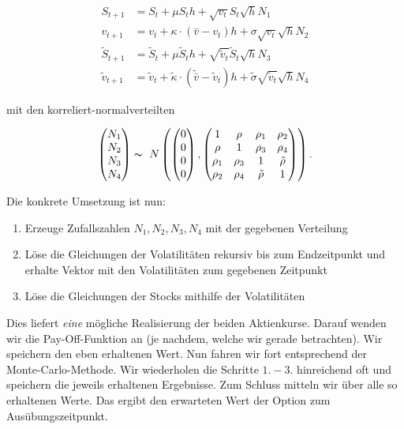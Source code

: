 \documentclass[12pt]{article}
\begin{document}
\begin{align} \label{EMSPDE}
S_{t+1} &= S_t +\mu S_t h + \sqrt{v_t} S_t \sqrt{h} N_1 \\
v_{t+1} &= v_t +\kappa\cdot(\bar{v}-v_t) h + \sigma\sqrt{v_t}\sqrt{h} N_2\\
\tilde{S}_{t+1} &= \tilde{S}_t +\mu \tilde{S}_t h + \sqrt{\tilde{v}_t} \tilde{S}_t \sqrt{h} N_3 \\
\tilde{v}_{t+1} &= \tilde{v}_t +\tilde{\kappa}\cdot(\tilde{\bar{v}}-\tilde{v}_t) h + \tilde{\sigma}\sqrt{\tilde{v}_t}\sqrt{h} N_4
\end{align}

mit den korreliert-normalverteilten

\begin{align*}
\left(\begin{matrix}
N_1\\N_2\\N_3\\N_4
\end{matrix}\right)
\thicksim \
N\left(
\left(\begin{matrix}
0\\0\\0\\0
\end{matrix}\right),
\left(\begin{matrix}
1& \rho& \rho_1& \rho_2\\
\rho& 1& \rho_3& \rho_4\\
\rho_1& \rho_3& 1& \tilde{\rho}\\
\rho_2& \rho_4& \tilde{\rho}& 1
\end{matrix}\right)
\right).
\end{align*}

Die konkrete Umsetzung ist nun:
\begin{enumerate}
\item Erzeuge Zufallszahlen $N_1, N_2, N_3, N_4$ mit der gegebenen Verteilung
\item Löse die Gleichungen der Volatilitäten rekursiv bis zum Endzeitpunkt und erhalte Vektor mit den Volatilitäten zum gegebenen Zeitpunkt
\item Löse die Gleichungen der Stocks mithilfe der Volatilitäten
\end{enumerate}

Dies liefert \textit{eine} mögliche Realisierung der beiden Aktienkurse. Darauf wenden wir die Pay-Off-Funktion an (je nachdem, welche wir gerade betrachten). Wir speichern den eben erhaltenen Wert.
Nun fahren wir fort entsprechend der Monte-Carlo-Methode. Wir wiederholen die Schritte $1.-3.$ hinreichend oft und speichern die jeweils erhaltenen Ergebnisse. Zum Schluss mitteln wir über alle so erhaltenen Werte. Das ergibt den erwarteten Wert der Option zum Ausübungszeitpunkt.
\end{document}
